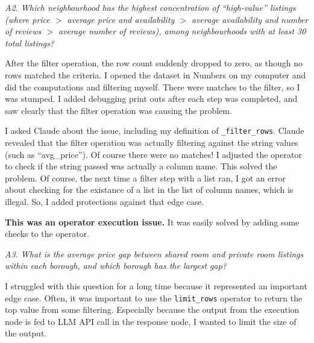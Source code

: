 

\textit{A2. Which neighbourhood has the highest concentration of ``high-value'' listings (where price \texorpdfstring{$>$}{is greater than} average price and availability \texorpdfstring{$>$}{is greater than} average availability and number of reviews \texorpdfstring{$>$}{is greater than} average number of reviews), among neighbourhoods with at least 30 total listings?}



After the filter operation, the row count suddenly dropped to zero, as though no rows matched the criteria. I opened the dataset in Numbers on my computer and did the computations and filtering myself. There were matches to the filter, so I was stumped. I added debugging print outs after each step was completed, and saw clearly that the filter operation was causing the problem.

I asked Claude about the issue, including my definition of \texttt{\_filter\_rows}. Claude revealed that the filter operation was actually filtering against the string values (such as ``avg\_price''). Of course there were no matches! I adjusted the operator to check if the string passed was actually a column name. This solved the problem. Of course, the next time a filter step with a list ran, I got an error about checking for the existance of a list in the list of column names, which is illegal. So, I added protections against that edge case.

\textbf{This was an operator execution issue.} It was easily solved by adding some checks to the operator.



\textit{A3. What is the average price gap between shared room and private room listings within each borough, and which borough has the largest gap?}



I struggled with this question for a long time because it represented an important edge case. Often, it was important to use the \texttt{limit\_rows} operator to return the top value from some filtering. Especially because the output from the execution node is fed to LLM API call in the response node, I wanted to limit the size of the output.


